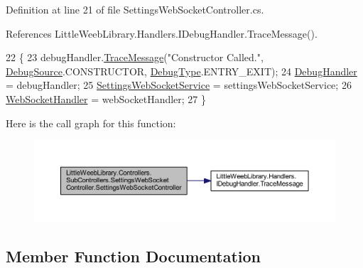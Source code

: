 Definition at line 21 of file Settings\+Web\+Socket\+Controller.\+cs.



References Little\+Weeb\+Library.\+Handlers.\+I\+Debug\+Handler.\+Trace\+Message().


\begin{DoxyCode}
22         \{
23             debugHandler.\mbox{\hyperlink{interface_little_weeb_library_1_1_handlers_1_1_i_debug_handler_a2e405bc3492e683cd3702fae125221bc}{TraceMessage}}(\textcolor{stringliteral}{"Constructor Called."}, 
      \mbox{\hyperlink{namespace_little_weeb_library_1_1_handlers_a2a6ca0775121c9c503d58aa254d292be}{DebugSource}}.CONSTRUCTOR, \mbox{\hyperlink{namespace_little_weeb_library_1_1_handlers_ab66019ed40462876ec4e61bb3ccb0a62}{DebugType}}.ENTRY\_EXIT);
24             \mbox{\hyperlink{class_little_weeb_library_1_1_handlers_1_1_debug_handler}{DebugHandler}} = debugHandler;
25             \mbox{\hyperlink{class_little_weeb_library_1_1_services_1_1_settings_web_socket_service}{SettingsWebSocketService}} = settingsWebSocketService;
26             \mbox{\hyperlink{class_little_weeb_library_1_1_handlers_1_1_web_socket_handler}{WebSocketHandler}} = webSocketHandler;
27         \}
\end{DoxyCode}
Here is the call graph for this function\+:\nopagebreak
\begin{figure}[H]
\begin{center}
\leavevmode
\includegraphics[width=350pt]{class_little_weeb_library_1_1_controllers_1_1_sub_controllers_1_1_settings_web_socket_controller_a81701a5495065390949f1672fcac1f40_cgraph}
\end{center}
\end{figure}


\subsection{Member Function Documentation}
\mbox{\label{class_little_weeb_library_1_1_controllers_1_1_sub_controllers_1_1_settings_web_socket_controller_a39b333aee248388fd295a8511486c76e}} 
